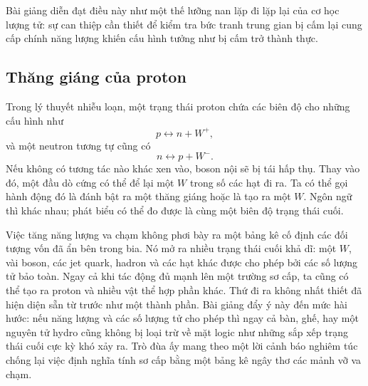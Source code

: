 Bài giảng diễn đạt điều này như một thế lưỡng nan lặp đi lặp lại của cơ học lượng tử: sự can thiệp cần thiết để kiểm tra bức tranh trung gian bị cấm lại cung cấp chính năng lượng khiến cấu hình tưởng như bị cấm trở thành thực.

\subsection{Thăng giáng của proton}

Trong lý thuyết nhiễu loạn, một trạng thái proton chứa các biên độ cho những cấu hình như
\begin{equation}
  p\longleftrightarrow n+W^+,
\end{equation}
và một neutron tương tự cũng có
\begin{equation}
  n\longleftrightarrow p+W^-.
\end{equation}
Nếu không có tương tác nào khác xen vào, boson nội sẽ bị tái hấp thụ. Thay vào đó, một đầu dò cứng có thể để lại một \(W\) trong số các hạt đi ra. Ta có thể gọi hành động đó là đánh bật ra một thăng giáng hoặc là tạo ra một \(W\). Ngôn ngữ thì khác nhau; phát biểu có thể đo được là cùng một biên độ trạng thái cuối.

\begin{classroomqa}
\end{classroomqa}

Việc tăng năng lượng va chạm không phơi bày ra một bảng kê cố định các đối tượng vốn đã ẩn bên trong bia. Nó mở ra nhiều trạng thái cuối khả dĩ: một \(W\), vài boson, các jet quark, hadron và các hạt khác được cho phép bởi các số lượng tử bảo toàn. Ngay cả khi tác động đủ mạnh lên một trường sơ cấp, ta cũng có thể tạo ra proton và nhiều vật thể hợp phần khác. Thứ đi ra không nhất thiết đã hiện diện sẵn từ trước như một thành phần. Bài giảng đẩy ý này đến mức hài hước: nếu năng lượng và các số lượng tử cho phép thì ngay cả bàn, ghế, hay một nguyên tử hydro cũng không bị loại trừ về mặt logic như những sắp xếp trạng thái cuối cực kỳ khó xảy ra. Trò đùa ấy mang theo một lời cảnh báo nghiêm túc chống lại việc định nghĩa tính sơ cấp bằng một bảng kê ngây thơ các mảnh vỡ va chạm.

